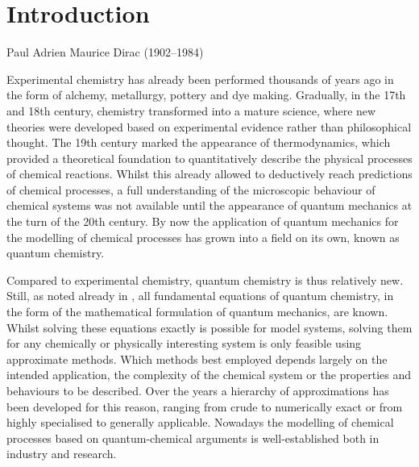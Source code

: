 \chapter{Introduction}
{Paul Adrien Maurice Dirac (1902--1984)}

\noindent
Experimental chemistry
has already been performed thousands of years ago
in the form of alchemy, metallurgy, pottery and dye making.
Gradually,
in the 17th and 18th century,
chemistry transformed into a mature science,
where new theories were developed based on
experimental evidence rather than philosophical thought.
The 19th century marked the appearance of thermodynamics,
which provided a theoretical foundation
to quantitatively describe the physical processes of chemical reactions.
Whilst this already allowed to deductively reach predictions of chemical processes,
a full understanding of the microscopic behaviour
of chemical systems was not available until the appearance
of quantum mechanics at the turn of the 20th century.
By now the application of quantum mechanics for the modelling of chemical processes
has grown into a field on its own, known as quantum chemistry.

Compared to experimental chemistry, quantum chemistry is thus relatively new.
Still, as \citet{Dirac1929} noted already in \citeyear{Dirac1929},
all fundamental equations of quantum chemistry,
in the form of the mathematical formulation of quantum mechanics, are known.
Whilst solving these equations exactly is possible for model systems,
solving them for any chemically or physically
interesting system is only feasible using approximate methods.
Which methods best employed depends largely on the intended application,
\ie the complexity of the chemical system
or the properties and behaviours to be described.
Over the years a hierarchy of approximations has been developed for this reason,
ranging from crude to numerically exact
or from highly specialised to generally applicable.
Nowadays the modelling of chemical processes
based on quantum-chemical arguments
is well-established both in industry and research.

